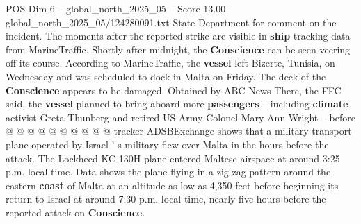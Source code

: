 \begin{textsample}{POS Dim 6 – global\_north\_2025\_05 – Score 13.00 – global\_north\_2025\_05/124280091.txt}
State Department for comment on the incident.
The moments after the reported strike are visible in \textbf{ship} tracking data from MarineTraffic.
Shortly after midnight, the \textbf{Conscience} can be seen veering off its course.
According to MarineTraffic, the \textbf{vessel} left Bizerte, Tunisia, on Wednesday and was scheduled to dock in Malta on Friday.
The deck of the \textbf{Conscience} appears to be damaged.
Obtained by ABC News There, the FFC said, the \textbf{vessel} planned to bring aboard more \textbf{passengers} -- including \textbf{climate} activist Greta Thunberg and retired US Army Colonel Mary Ann Wright -- before @ @ @ @ @ @ @ @ @ @ tracker ADSBExchange shows that a military transport plane operated by Israel ' s military flew over Malta in the hours before the attack.
The Lockheed KC-130H plane entered Maltese airspace at around 3:25 p.m. local time.
Data shows the plane flying in a zig-zag pattern around the eastern \textbf{coast} of Malta at an altitude as low as 4,350 feet before beginning its return to Israel at around 7:30 p.m. local time, nearly five hours before the reported attack on \textbf{Conscience}.

\end{textsample}
